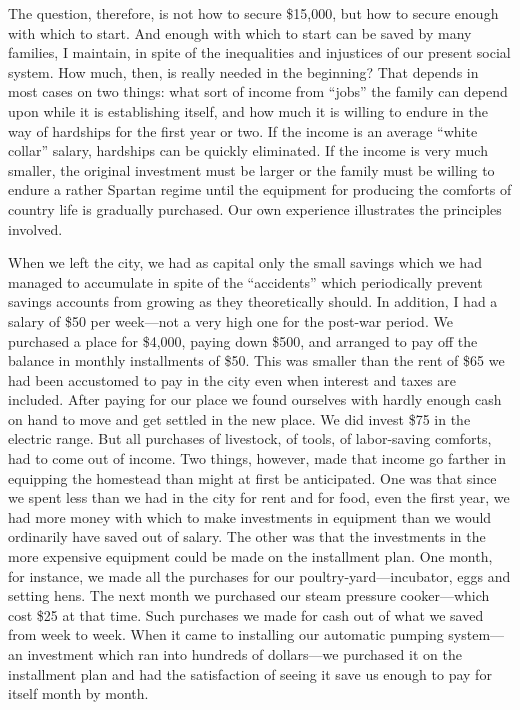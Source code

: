 \documentclass{book}
\begin{document}
The question, therefore, is not how to secure \$15,000, but how to secure enough with which to start. And enough with which to start can be saved by many families, I maintain, in spite of the inequalities and injustices of our present social system. How much, then, is really needed in the beginning? That depends in most cases on two things: what sort of income from “jobs” the family can depend upon while it is establishing itself, and how much it is willing to endure in the way of hardships for the first year or two. If the income is an average “white collar” salary, hardships can be quickly eliminated. If the income is very much smaller, the original investment must be larger or the family must be willing to endure a rather Spartan regime until the equipment for producing the comforts of country life is gradually purchased. Our own experience illustrates the principles involved.

When we left the city, we had as capital only the small savings which we had managed to accumulate in spite of the “accidents” which periodically prevent savings accounts from growing as they theoretically should. In addition, I had a salary of \$50 per week—not a very high one for the post-war period. We purchased a place for \$4,000, paying down \$500, and arranged to pay off the balance in monthly installments of \$50. This was smaller than the rent of \$65 we had been accustomed to pay in the city even when interest and taxes are included. After paying for our place we found ourselves with hardly enough cash on hand to move and get settled in the new place. We did invest \$75 in the electric range. But all purchases of livestock, of tools, of labor-saving comforts, had to come out of income. Two things, however, made that income go farther in equipping the homestead than might at first be anticipated. One was that since we spent less than we had in the city for rent and for food, even the first year, we had more money with which to make investments in equipment than we would ordinarily have saved out of salary. The other was that the investments in the more expensive equipment could be made on the installment plan. One month, for instance, we made all the purchases for our poultry-yard—incubator, eggs and setting hens. The next month we purchased our steam pressure cooker—which cost \$25 at that time. Such purchases we made for cash out of what we saved from week to week. When it came to installing our automatic pumping system—an investment which ran into hundreds of dollars—we purchased it on the installment plan and had the satisfaction of seeing it save us enough to pay for itself month by month.
\end{document}
